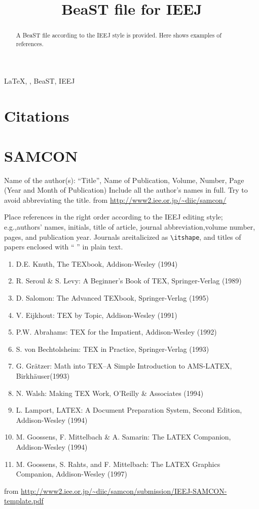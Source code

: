 \documentclass[english,letter]{ieej-e}
\title{BeaST file for IEEJ}
\begin{document}
\begin{abstract}
A BeaST file according to the IEEJ style is provided.
Here shows examples of references.
\end{abstract}
\begin{keyword}
  \LaTeX, , BeaST, IEEJ
\end{keyword}
\maketitle


\section*{Citations}
\Cite{Denki2001,Knuth1994,Yamada2001}


\section{SAMCON}
Name of the author(s): ``Title'', Name of Publication, Volume, Number, Page (Year and Month of Publication)
Include all the author's names in full.
Try to avoid abbreviating the title.
from \url{http://www2.iee.or.jp/~diic/samcon/}

Place references in the right order according to the IEEJ editing style; e.g.,authors' names, initials, title of article, journal abbreviation,volume number, pages, and publication year.
Journals areitalicized as \texttt{\textbackslash itshape}, and titles of papers enclosed with `` '' in plain text.
\footnotesize
\begin{enumerate}
  \item D.E. Knuth, The TEXbook, Addison-Wesley (1994)
  \item R. Seroul \& S. Levy: A Beginner's Book of TEX, Springer-Verlag (1989)
  \item D. Salomon: The Advanced TEXbook, Springer-Verlag (1995)
  \item V. Eijkhout: TEX by Topic, Addison-Wesley (1991)
  \item P.W. Abrahams: TEX for the Impatient, Addison-Wesley (1992)
  \item S. von Bechtolsheim: TEX in Practice, Springer-Verlag (1993)
  \item G. Gr\"atzer: Math into TEX–A Simple Introduction to AMS-LATEX, Birkh\"auser(1993)
  \item N. Walsh: Making TEX Work, O'Reilly \& Associates (1994)
  \item L. Lamport, LATEX:  A Document Preparation System, Second Edition, Addison-Wesley (1994)
  \item M. Goossens, F. Mittelbach \& A. Samarin: The LATEX Companion, Addison-Wesley (1994)
  \item M. Goossens, S. Rahts, and F. Mittelbach: The LATEX Graphics Companion, Addison-Wesley (1997)
\end{enumerate}
\normalsize
from \url{http://www2.iee.or.jp/~diic/samcon/submission/IEEJ-SAMCON-template.pdf}
\end{document}
